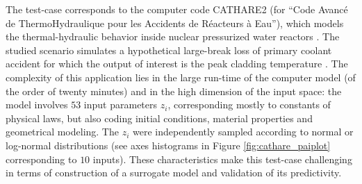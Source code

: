 The test-case corresponds to  the computer code CATHARE2 (for ``Code Avanc\'e de ThermoHydraulique pour les Accidents de R\'eacteurs \`a Eau''), which models the thermal-hydraulic behavior inside nuclear pressurized water reactors \cite{gefant11}.
The studied scenario simulates a hypothetical large-break loss of primary coolant accident for which the output of interest is the peak cladding temperature \cite{decbaz08,ioobou10}.
The complexity of this application lies in the large run-time  of the computer model (of the order of twenty minutes) and in the high dimension of the input space: the model involves $53$  input parameters $z_i$, corresponding mostly to constants of physical laws, but also coding initial conditions, material properties and geometrical modeling. The $z_i$ were independently sampled according to normal or log-normal distributions (see axes histograms in Figure \ref{fig:cathare_paiplot} corresponding to $10$ inputs).
These characteristics make this test-case challenging in terms of construction of a surrogate model and validation of its predictivity.

%    


    

